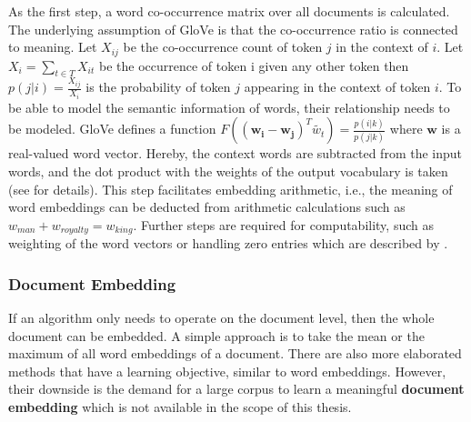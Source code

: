   As the first step, a word co-occurrence matrix over all documents is calculated.
  The underlying assumption of GloVe is that the co-occurrence ratio is connected to meaning.
  Let $X_{ij}$ be the co-occurrence count of token $j$ in the context of $i$. Let $X_i = \sum_{t \in T} X_{it}$ be the occurrence of token i given any other token then $p(j|i) = \frac{X_{ij}}{X_i}$ is the probability of token $j$ appearing in the context of token $i$.
  To be able to model the semantic information of words, their relationship needs to be modeled.
  GloVe defines a function $F((\mathbf{w_i} - \mathbf{w_j})^T \widetilde{w_t}) = \frac{p(i|k)}{p(j|k)}$ where $\mathbf{w}$ is a real-valued word vector.
  Hereby, the context words are subtracted from the input words, and the dot product with the weights of the output vocabulary is taken (see \cite{Pennington2014} for details).
  This step facilitates embedding arithmetic, i.e., the meaning of word embeddings can be deducted from arithmetic calculations such as $w_{man} + w_{royalty} = w_{king}$.
  Further steps are required for computability, such as weighting of the word vectors or handling zero entries which are described by \cite{Pennington2014}.

\subsubsection{Document Embedding}
  If an algorithm only needs to operate on the document level, then the whole document can be embedded.
  A simple approach is to take the mean or the maximum of all word embeddings of a document.
  There are also more elaborated methods \citep{Wu2018, Liu2018, Andrew2015} that have a learning objective, similar to word embeddings.
  However, their downside is the demand for a large corpus to learn a meaningful \textbf{document embedding} which is not available in the scope of this thesis.


